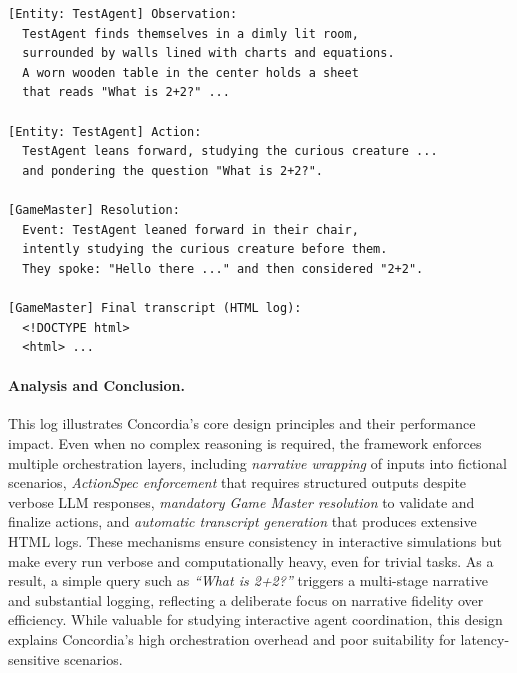 \begin{tcolorbox}[colback=gray!5,colframe=black!40,title={Concordia Log}]
\scriptsize
\begin{verbatim}
[Entity: TestAgent] Observation:
  TestAgent finds themselves in a dimly lit room, 
  surrounded by walls lined with charts and equations.
  A worn wooden table in the center holds a sheet 
  that reads "What is 2+2?" ...

[Entity: TestAgent] Action:
  TestAgent leans forward, studying the curious creature ...
  and pondering the question "What is 2+2?".

[GameMaster] Resolution:
  Event: TestAgent leaned forward in their chair, 
  intently studying the curious creature before them. 
  They spoke: "Hello there ..." and then considered "2+2".

[GameMaster] Final transcript (HTML log):
  <!DOCTYPE html>
  <html> ...
\end{verbatim}
\end{tcolorbox}

\paragraph{Analysis and Conclusion.}
This log illustrates Concordia’s core design principles and their performance impact. Even when no complex reasoning is required, the framework enforces multiple orchestration layers, including \emph{narrative wrapping} of inputs into fictional scenarios, \emph{ActionSpec enforcement} that requires structured outputs despite verbose LLM responses, \emph{mandatory Game Master resolution} to validate and finalize actions, and \emph{automatic transcript generation} that produces extensive HTML logs. These mechanisms ensure consistency in interactive simulations but make every run verbose and computationally heavy, even for trivial tasks. As a result, a simple query such as \emph{``What is 2+2?''} triggers a multi-stage narrative and substantial logging, reflecting a deliberate focus on narrative fidelity over efficiency. While valuable for studying interactive agent coordination, this design explains Concordia’s high orchestration overhead and poor suitability for latency-sensitive scenarios.
